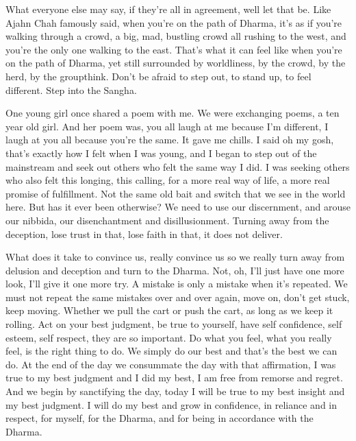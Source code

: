 \documentclass[12pt,openany]{book}
\begin{document}
What everyone else may say, if they're all in agreement, well let that be. Like Ajahn Chah famously said, when you're on the path of Dhar\-ma, it’s as if you're walking through a crowd, a big, mad, bustling crowd all rushing to the west, and you're the only one walking to the east. That's what it can feel like when you're on the path of Dhar\-ma, yet still surrounded by worldliness, by the crowd, by the herd, by the groupthink. Don't be afraid to step out, to stand up, to feel different. Step into the Sangha.

One young girl once shared a poem with me. We were exchanging poems, a ten year old girl. And her poem was, you all laugh at me because I'm different, I laugh at you all because you're the same. It gave me chills. I said oh my gosh, that's exactly how I felt when I was young, and I began to step out of the mainstream and seek out others who felt the same way I did. I was seeking others who also felt this longing, this calling, for a more real way of life, a more real promise of fulfillment. Not the same old bait and switch that we see in the world here. But has it ever been otherwise? We need to use our discernment, and arouse our nibbida, our disenchantment and disillusionment. Turning away from the deception, lose trust in that, lose faith in that, it does not deliver.

What does it take to convince us, really convince us so we really turn away from delusion and deception and turn to the Dhar\-ma. Not, oh, I'll just have one more look, I'll give it one more try. A mistake is only a mistake when it’s repeated. We must not repeat the same mistakes over and over again, move on, don't get stuck, keep moving. Whether we pull the cart or push the cart, as long as we keep it rolling. Act on your best judgment, be true to yourself, have self confidence, self esteem, self respect, they are so important. Do what you feel, what you really feel, is the right thing to do. We simply do our best and that's the best we can do. At the end of the day we consummate the day with that affirmation, I was true to my best judgment and I did my best, I am free from remorse and regret. And we begin by sanctifying the day, today I will be true to my best insight and my best judgment. I will do my best and grow in confidence, in reliance and in respect, for myself, for the Dhar\-ma, and for being in accordance with the Dhar\-ma. 
\end{document}
